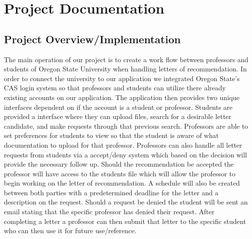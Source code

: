 \section{Project Documentation}

\subsection{Project Overview/Implementation}
\noindent The main operation of our project is to create a work flow between professors and students of Oregon State University when handling letters of recommendation. In order to connect the university to our application we integrated Oregon State's CAS login system so that professors and students can utilize there already existing accounts on our application. The application then provides two unique interfaces dependent on if the account is a student or professor. Students are provided a interface where they can upload files, search for a desirable letter candidate, and make requests through that previous search. Professors are able to set preferences for students to view so that the student is aware of what documentation to upload for that professor. Professors can also handle all letter requests from students via a accept/deny system which based on the decision will provide the necessary follow up. Should the recommendation be accepted the professor will have access to the students file which will allow the professor to begin working on the letter of recommendation. A schedule will also be created between both parties with a predetermined deadline for the letter and a description on the request. Should a request be denied the student will be sent an email stating that the specific professor has denied their request. After completing a letter a professor can then submit that letter to the specific student who can then use it for future use/reference.

